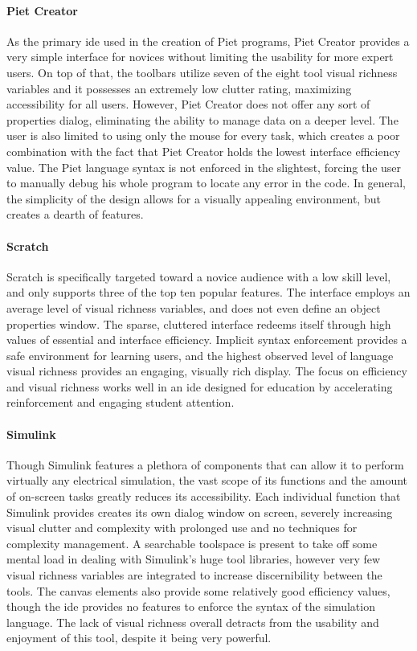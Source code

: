 \paragraph{Piet Creator} As the primary \ac{ide} used in the creation of
Piet programs, Piet Creator provides a very simple interface for novices
without limiting the usability for more expert users. On top of that, the
toolbars utilize seven of the eight tool visual richness variables and it
possesses an extremely low clutter rating, maximizing accessibility for all
users. However, Piet Creator does not offer any sort of properties dialog,
eliminating the ability to manage data on a deeper level. The user is also
limited to using only the mouse for every task, which creates a poor
combination with the fact that Piet Creator holds the lowest interface
efficiency value. The Piet language syntax is not enforced in the
slightest, forcing the user to manually debug his whole program to locate
any error in the code. In general, the simplicity of the design allows for
a visually appealing environment, but creates a dearth of features.

\paragraph{Scratch} Scratch is specifically targeted toward a novice
audience with a low skill level, and only supports three of the top ten
popular features. The interface employs an average level of visual richness
variables, and does not even define an object properties window. The
sparse, cluttered interface redeems itself through high values of essential
and interface efficiency. Implicit syntax enforcement provides a safe
environment for learning users, and the highest observed level of language
visual richness provides an engaging, visually rich display. The focus on
efficiency and visual richness works well in an \ac{ide} designed for
education by accelerating reinforcement and engaging student attention.

\paragraph{Simulink} Though Simulink features a plethora of components that
can allow it to perform virtually any electrical simulation, the vast scope
of its functions and the amount of on-screen tasks greatly reduces its
accessibility. Each individual function that Simulink provides creates its
own dialog window on screen, severely increasing visual clutter and
complexity with prolonged use and no techniques for complexity management.
A searchable toolspace is present to take off some mental load in dealing
with Simulink's huge tool libraries, however very few visual richness
variables are integrated to increase discernibility between the tools. The
canvas elements also provide some relatively good efficiency values, though
the \ac{ide} provides no features to enforce the syntax of the simulation
language. The lack of visual richness overall detracts from the usability
and enjoyment of this tool, despite it being very powerful.

